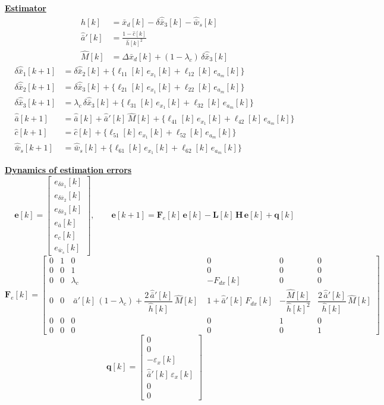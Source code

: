 \documentclass[11pt,a4paper]{ctexart}
\newcommand{\lc}{\lambda_c}
\newcommand{\bx}{\bar{x}}
\newcommand{\ba}{\bar{a}}
\newcommand{\bw}{\bar{w}}
\newcommand{\hh}{\hat{h}}
\newcommand{\ch}{\hat{c}}
\newcommand{\hd}[1]{\par\bigskip\noindent\underline{\textbf{#1}}}
\begin{document}
\hd{Estimator}
\[
\begin{aligned}
\hh[k] &= \bx_d[k] - \delta\hat{\bx}_3[k] - \hat{\bw}_s[k] \\
\hat{\ba}'[k] &= \frac{1 - \ch[k]}{\hh[k]^{2}} \\
\hat{M}[k] &= \Delta\bx_d[k] + (1-\lc)\,\delta\hat{\bx}_3[k]
\end{aligned}
\]
\[
\begin{aligned}
\delta\hat{\bx}_1[k+1] &= \delta\hat{\bx}_2[k] + \big\{\ell_{11}[k]\,e_{x_1}[k] + \ell_{12}[k]\,e_{a_m}[k]\big\} \\
\delta\hat{\bx}_2[k+1] &= \delta\hat{\bx}_3[k] + \big\{\ell_{21}[k]\,e_{x_1}[k] + \ell_{22}[k]\,e_{a_m}[k]\big\} \\
\delta\hat{\bx}_3[k+1] &= \lc\,\delta\hat{\bx}_3[k] + \big\{\ell_{31}[k]\,e_{x_1}[k] + \ell_{32}[k]\,e_{a_m}[k]\big\} \\
\hat{\ba}[k+1] &= \hat{\ba}[k] + \hat{\ba}'[k]\,\hat{M}[k] + \big\{\ell_{41}[k]\,e_{x_1}[k] + \ell_{42}[k]\,e_{a_m}[k]\big\} \\
\ch[k+1] &= \ch[k] + \big\{\ell_{51}[k]\,e_{x_1}[k] + \ell_{52}[k]\,e_{a_m}[k]\big\} \\
\hat{\bw}_s[k+1] &= \hat{\bw}_s[k] + \big\{\ell_{61}[k]\,e_{x_1}[k] + \ell_{62}[k]\,e_{a_m}[k]\big\}
\end{aligned}
\]

\hd{Dynamics of estimation errors}
\[
\mathbf{e}[k] = \begin{bmatrix} e_{\delta\bx_1}[k] \\ e_{\delta\bx_2}[k] \\ e_{\delta\bx_3}[k] \\ e_{\ba}[k] \\ e_c[k] \\ e_{\bw_s}[k] \end{bmatrix},
\qquad
\mathbf{e}[k+1] = \mathbf{F}_e[k]\,\mathbf{e}[k] - \mathbf{L}[k]\,\mathbf{H}\,\mathbf{e}[k] + \mathbf{q}[k]
\]
{\small
\[
\mathbf{F}_e[k] =
\begin{bmatrix}
0 & 1 & 0 & 0 & 0 & 0 \\
0 & 0 & 1 & 0 & 0 & 0 \\
0 & 0 & \lc & -F_{dx}[k] & 0 & 0 \\
0 & 0 & \;\hat{\ba}'[k]\,(1-\lc) + \dfrac{2\,\hat{\ba}'[k]}{\hh[k]}\,\hat{M}[k]\; & 1 + \hat{\ba}'[k]\,F_{dx}[k] & -\dfrac{\hat{M}[k]}{\hh[k]^{2}} & \dfrac{2\,\hat{\ba}'[k]}{\hh[k]}\,\hat{M}[k] \\
0 & 0 & 0 & 0 & 1 & 0 \\
0 & 0 & 0 & 0 & 0 & 1
\end{bmatrix}
\]
}
\[
\mathbf{q}[k] = \begin{bmatrix} 0 \\ 0 \\ -\varepsilon_x[k] \\ \hat{\ba}'[k]\,\varepsilon_x[k] \\ 0 \\ 0 \end{bmatrix}
\]
\end{document}
